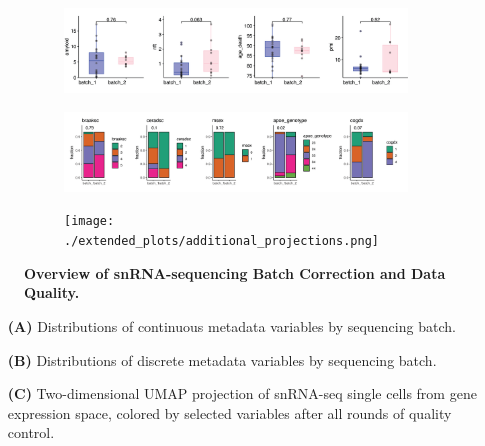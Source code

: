 \begin{figure}[H]
    \begin{subfigure}[t]{\textwidth}
        \caption{}
        \includegraphics[width=\textwidth]{./extended_plots/seq_batch_cont.png}        
    \end{subfigure}
    \begin{subfigure}[t]{\textwidth}
        \caption{}
        \includegraphics[width=\textwidth]{./extended_plots/seq_batch_cat.png}        
    \end{subfigure}  
    \begin{subfigure}[t]{\textwidth}
        \caption{}
        \texttt{[image: ./extended\_plots/additional\_projections.png]}        
    \end{subfigure}   
    \caption{
        \textbf{Overview of snRNA-sequencing Batch Correction and Data Quality.}\\
    }
    \label{fig:snRNA_quality_annotation}
\end{figure}
\begin{itemize}
    \item[\textbf{(A)}] Distributions of continuous metadata variables by sequencing batch. 
    \item[\textbf{(B)}] Distributions of discrete metadata variables by sequencing batch. 
    \item[\textbf{(C)}] Two-dimensional UMAP projection of snRNA-seq single cells from gene expression space, colored by selected variables after all rounds of quality control. 
\end{itemize}